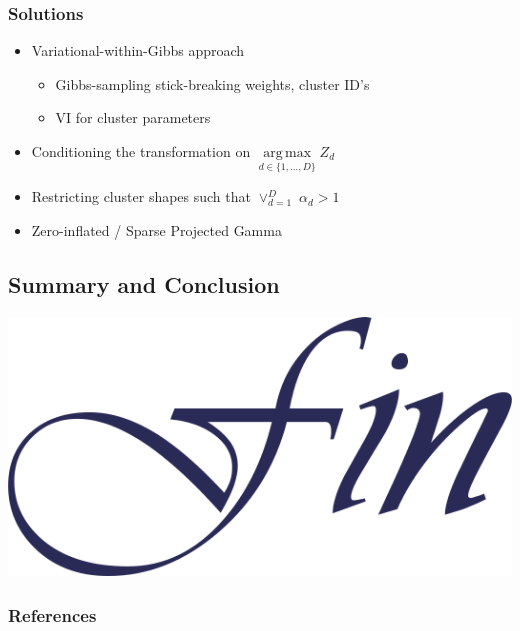 \documentclass[aspectratio=169,10pt]{beamer}
\DeclareMathOperator*{\argmax}{arg\,max}
\newlength{\frametextheight}
\begin{document}
\begin{frame}
    \frametitle{Solutions}
    \begin{itemize}
        \item Variational-within-Gibbs approach \cite{Loaizamaya2022}
        \begin{itemize}
            \item Gibbs-sampling stick-breaking weights, cluster ID's
            \item VI for cluster parameters
        \end{itemize}
        \item Conditioning the transformation on 
            $\argmax\limits_{d \in \lbrace 1,\ldots, D\rbrace} Z_d$
        \item Restricting cluster shapes such that $\vee_{d = 1}^D\; \alpha_d > 1$
        \item Zero-inflated / Sparse Projected Gamma
    \end{itemize}
\end{frame}


\subsection{Summary and Conclusion}






\begin{frame}[plain]
    \begin{center}
        \includegraphics[height=0.7\frametextheight]{./ch1/images/fin}
    \end{center}
\end{frame} %

\appendix

\begin{frame}[allowframebreaks]
    \frametitle{References}
    \footnotesize
    
\end{frame}
\end{document}
